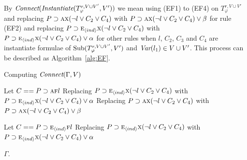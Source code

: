 \documentclass[letterpaper]{article} %
\begin{document}
By $\emph{Connect}(\emph{Instantiate}(T_{\varphi}^{r,V \cup V'}, V'))$ we mean using (EF1) to (EF4) on $T_{\varphi}^{r,V \cup V'}$ and replacing $P\supset \textsc{a}\textsc{x} (\neg l \vee C_2 \vee C_4)$ with $P\supset \textsc{a}\textsc{x} (\neg l \vee C_2 \vee C_4) \vee \beta$ for rule (EF2) and replacing $P\supset \textsc{e}_{{\langle{ind}\rangle}}\textsc{x} (\neg l \vee C_2 \vee C_4)$ with $P\supset \textsc{e}_{{\langle{ind}\rangle}}\textsc{x} (\neg l \vee C_2 \vee C_4) \vee \alpha$ for other rules when $l$, $C_2$, $C_3$  and $C_4$ are instantiate formulae of  $\textrm{Sub}(T_{\varphi}^{r,V \cup V'}, V')$ and $\textit{Var}(l_1) \in V\cup V'$.
This process can be described as Algorithm~\ref{alg:EF}.
\begin{algorithm}[!h]
\caption{Computing $\emph{Connect}(\Gamma, V)$}%
\label{alg:EF}

 {
    Let $C == P \supset \textsc{a} \textsc{f} l$\;
     {
        Replacing $P\supset \textsc{e}_{{\langle{ind}\rangle}}\textsc{x} (\neg l \vee C_2 \vee C_4)$ with $P\supset \textsc{e}_{{\langle{ind}\rangle}}\textsc{x} (\neg l \vee C_2 \vee C_4) \vee \alpha$\;
    }
     {
        Replacing $P\supset \textsc{a}\textsc{x} (\neg l \vee C_2 \vee C_4)$ with $P\supset \textsc{a}\textsc{x} (\neg l \vee C_2 \vee C_4) \vee \beta$\;
    }
}


 {
    Let $C == P \supset \textsc{e}_{{\langle{ind}\rangle}} \textsc{f} l$\;
     {
        Replacing $P\supset \textsc{e}_{{\langle{ind}\rangle}}\textsc{x} (\neg l \vee C_2 \vee C_4)$ with $P\supset \textsc{e}_{{\langle{ind}\rangle}}\textsc{x} (\neg l \vee C_2 \vee C_4) \vee \alpha$\;
    }
}

\Return $\Gamma$.
\end{algorithm}
\end{document}
